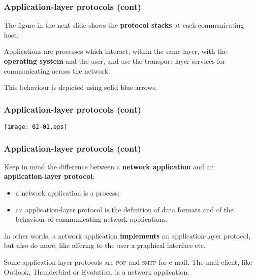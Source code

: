 %
\begin{frame}
\frametitle{Application-layer protocols (cont)}

The figure in the next slide shows the \textbf{protocol stacks} at
each communicating host.

\bigskip

Applications are processes which interact, within the same layer, with
the \textbf{operating system} and the user, and use the transport
layer services for communicating across the network.

\bigskip

This behaviour is depicted using solid blue arrows.

\end{frame}

%
\begin{frame}
\frametitle{Application-layer protocols (cont)}

\begin{center}
  \texttt{[image: 02-01.eps]}
\end{center}

\end{frame}

%
\begin{frame}
\frametitle{Application-layer protocols (cont)}

Keep in mind the difference between a \textbf{network application} and
an \textbf{application\hyp{}layer protocol}:
\begin{itemize}

  \item a network application is a process;

  \item an application-layer protocol is the definition of data
  formats and of the behaviour of communicating network applications.

\end{itemize}
In other words, a network application \textbf{implements} an
application-layer protocol, but also do more, like offering to the
user a graphical interface etc.

\bigskip

Some application-layer protocols are \textsc{pop} and \textsc{smtp}
for e-mail. The mail client, like \textsf{Outlook},
\textsf{Thunderbird} or \textsf{Evolution}, is a network application.

\end{frame}

